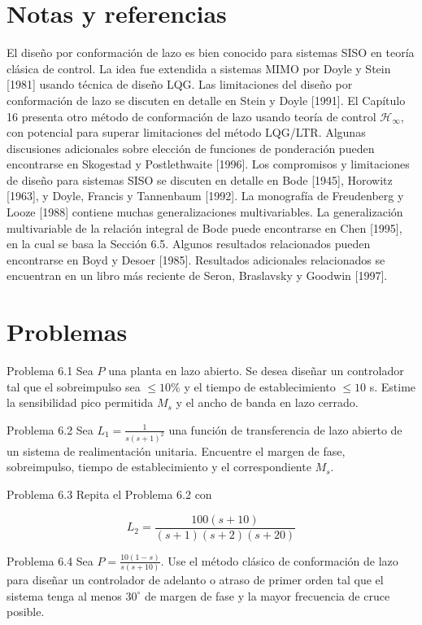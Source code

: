 \section{Notas y referencias}
El diseño por conformación de lazo es bien conocido para sistemas SISO en teoría clásica de control. La idea fue extendida a sistemas MIMO por Doyle y Stein [1981] usando técnica de diseño LQG. Las limitaciones del diseño por conformación de lazo se discuten en detalle en Stein y Doyle [1991]. El Capítulo 16 presenta otro método de conformación de lazo usando teoría de control $\mathcal{H}_{\infty}$, con potencial para superar limitaciones del método LQG/LTR. Algunas discusiones adicionales sobre elección de funciones de ponderación pueden encontrarse en Skogestad y Postlethwaite [1996]. Los compromisos y limitaciones de diseño para sistemas SISO se discuten en detalle en Bode [1945], Horowitz [1963], y Doyle, Francis y Tannenbaum [1992]. La monografía de Freudenberg y Looze [1988] contiene muchas generalizaciones multivariables. La generalización multivariable de la relación integral de Bode puede encontrarse en Chen [1995], en la cual se basa la Sección 6.5. Algunos resultados relacionados pueden encontrarse en Boyd y Desoer [1985]. Resultados adicionales relacionados se encuentran en un libro más reciente de Seron, Braslavsky y Goodwin [1997].

\section{Problemas}
Problema 6.1 Sea $P$ una planta en lazo abierto. Se desea diseñar un controlador tal que el sobreimpulso sea $\leq 10 \%$ y el tiempo de establecimiento $\leq 10$ s. Estime la sensibilidad pico permitida $M_{s}$ y el ancho de banda en lazo cerrado.

Problema 6.2 Sea $L_{1}=\frac{1}{s(s+1)^{2}}$ una función de transferencia de lazo abierto de un sistema de realimentación unitaria. Encuentre el margen de fase, sobreimpulso, tiempo de establecimiento y el correspondiente $M_{s}$.

Problema 6.3 Repita el Problema 6.2 con

$$
L_{2}=\frac{100(s+10)}{(s+1)(s+2)(s+20)}
$$

Problema 6.4 Sea $P=\frac{10(1-s)}{s(s+10)}$. Use el método clásico de conformación de lazo para diseñar un controlador de adelanto o atraso de primer orden tal que el sistema tenga al menos $30^{\circ}$ de margen de fase y la mayor frecuencia de cruce posible.

